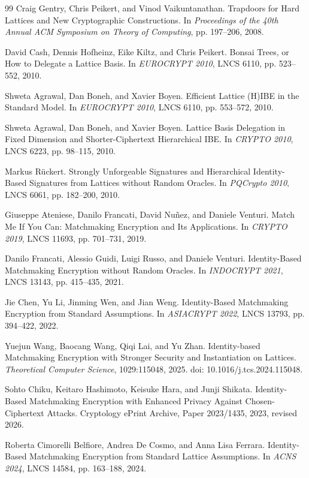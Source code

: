 \documentclass[UTF8,a4paper,12pt,oneside,openany,fontset=fandol]{ctexrep}
\begin{document}
\begin{thebibliography}{99}
Craig Gentry, Chris Peikert, and Vinod Vaikuntanathan.
Trapdoors for Hard Lattices and New Cryptographic Constructions.
In \emph{Proceedings of the 40th Annual ACM Symposium on Theory of Computing},
pp. 197--206, 2008.

David Cash, Dennis Hofheinz, Eike Kiltz, and Chris Peikert.
Bonsai Trees, or How to Delegate a Lattice Basis.
In \emph{EUROCRYPT 2010}, LNCS 6110, pp. 523--552, 2010.

Shweta Agrawal, Dan Boneh, and Xavier Boyen.
Efficient Lattice (H)IBE in the Standard Model.
In \emph{EUROCRYPT 2010}, LNCS 6110, pp. 553--572, 2010.

Shweta Agrawal, Dan Boneh, and Xavier Boyen.
Lattice Basis Delegation in Fixed Dimension and Shorter-Ciphertext Hierarchical IBE.
In \emph{CRYPTO 2010}, LNCS 6223, pp. 98--115, 2010.

Markus R\"uckert.
Strongly Unforgeable Signatures and Hierarchical Identity-Based Signatures from Lattices without Random Oracles.
In \emph{PQCrypto 2010}, LNCS 6061, pp. 182--200, 2010.

Giuseppe Ateniese, Danilo Francati, David Nu\~nez, and Daniele Venturi.
Match Me If You Can: Matchmaking Encryption and Its Applications.
In \emph{CRYPTO 2019}, LNCS 11693, pp. 701--731, 2019.

Danilo Francati, Alessio Guidi, Luigi Russo, and Daniele Venturi.
Identity-Based Matchmaking Encryption without Random Oracles.
In \emph{INDOCRYPT 2021}, LNCS 13143, pp. 415--435, 2021.

Jie Chen, Yu Li, Jinming Wen, and Jian Weng.
Identity-Based Matchmaking Encryption from Standard Assumptions.
In \emph{ASIACRYPT 2022}, LNCS 13793, pp. 394--422, 2022.

Yuejun Wang, Baocang Wang, Qiqi Lai, and Yu Zhan.
Identity-based Matchmaking Encryption with Stronger Security and Instantiation on Lattices.
\emph{Theoretical Computer Science}, 1029:115048, 2025.
doi: 10.1016/j.tcs.2024.115048.

Sohto Chiku, Keitaro Hashimoto, Keisuke Hara, and Junji Shikata.
Identity-Based Matchmaking Encryption with Enhanced Privacy Against Chosen-Ciphertext Attacks.
Cryptology ePrint Archive, Paper 2023/1435, 2023, revised 2026.

Roberta Cimorelli Belfiore, Andrea De Cosmo, and Anna Lisa Ferrara.
Identity-Based Matchmaking Encryption from Standard Lattice Assumptions.
In \emph{ACNS 2024}, LNCS 14584, pp. 163--188, 2024.


\end{thebibliography}
\end{document}
